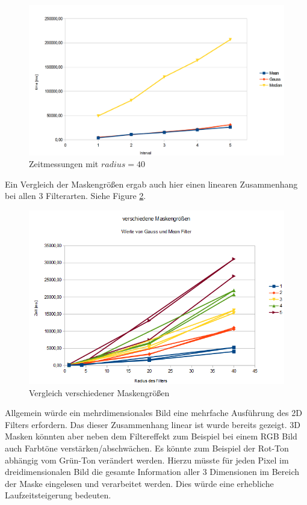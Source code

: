 \documentclass[12pt,german]{article}
\begin{document}
\begin{figure}[H]
	\centering
	\includegraphics[width=12cm]{TimeEvaluationGraph_allBig.png}
	\caption{Zeitmessungen mit $radius = 40 $ }
	\label{fig: timeOfBigMask}
\end{figure}

Ein Vergleich der Maskengrößen ergab auch hier einen linearen Zusammenhang bei allen 3 Filterarten. Siehe Figure \ref{fig: maskenGroessenVergleich}.

\begin{figure}[H]
	\centering
	\includegraphics[width=12cm]{Maskengroessenvergleich.png}
	\caption{Vergleich verschiedener Maskengrößen}
	\label{fig: maskenGroessenVergleich}
\end{figure}

Allgemein würde ein mehrdimensionales Bild eine mehrfache Ausführung des 2D Filters erfordern. Das dieser Zusammenhang linear ist wurde bereits gezeigt. 3D Masken könnten aber neben dem Filtereffekt zum Beispiel bei einem RGB Bild auch Farbtöne verstärken/abschwächen. Es könnte zum Beispiel der Rot-Ton abhängig vom Grün-Ton verändert werden. Hierzu müsste für jeden Pixel im dreidimensionalen Bild die gesamte Information aller 3 Dimensionen im Bereich der Maske eingelesen und verarbeitet werden. Dies würde eine erhebliche Laufzeitsteigerung bedeuten. 
\end{document}
